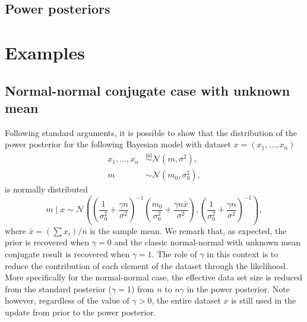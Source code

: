 \documentclass[12pt]{article}
\begin{document}
\subsection{Power posteriors}

\section{Examples}

\subsection{Normal-normal conjugate case with unknown mean}
Following standard arguments, it is possible to show that the distribution of
the power posterior for the following Bayesian model with dataset $x = (x_1,
\ldots, x_n)$
\begin{subequations}
\begin{align}
	x_1, \ldots, x_n &\overset{\mathrm{iid}}{\sim} \mathcal{N}(m, \sigma^2), \\
m &\sim \mathcal{N}(m_0, \sigma_0^2),
\end{align}
\end{subequations}
is normally distributed
\begin{equation*}
m \;|\; x \sim \mathcal{N} \left( \left( \frac{1}{\sigma_0^2} + \frac{\gamma n}{\sigma^2} \right)^{-1} \left(\frac{m_0}{\sigma_0^2} + \frac{\gamma n \bar{x}}{\sigma^2}  \right), \left( \frac{1}{\sigma_0^2} + \frac{\gamma n}{\sigma^2} \right)^{-1} \right),
\end{equation*}
where $\bar{x} = (\sum x_i)/ n$ is the sample mean. We remark that, as
expected, the prior is recovered when $\gamma = 0$ and the classic
normal-normal with unknown mean conjugate result is recovered when $\gamma =
1$. The role of $\gamma$ in this context is to reduce the contribution of each
element of the dataset through the likelihood. More specifically for the
normal-normal case, the effective data set size is reduced from the standard
posterior ($\gamma = 1$) from $n$ to $n \gamma$ in the power posterior. Note
however, regardless of the value of $\gamma > 0$, the entire dataset $x$ is
still used in the update from prior to the power posterior.
\end{document}
